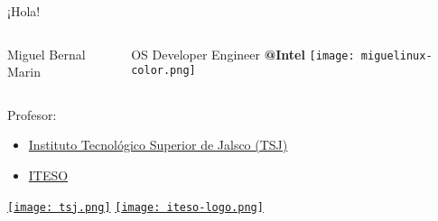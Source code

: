 
\begin{frame}[c]{¡Hola!}

  \begin{columns}
      Miguel Bernal Marin

      \vspace{\baselineskip}
      OS Developer Engineer \textbf{@Intel}
      \texttt{[image: miguelinux-color.png]}
  \end{columns}

  Profesor:
  \begin{itemize}
    \item \href{http://tsj.mx/}{Instituto Tecnológico Superior
      de Jalsco (TSJ)}
    \item \href{https://iteso.mx/}{ITESO}
  \end{itemize}

  \begin{center}
    \href{http://tecmm.edu.mx/}{\texttt{[image: tsj.png]}}
    \hspace{2cm}
    \href{https://iteso.mx/}{\texttt{[image: iteso-logo.png]}}
  \end{center}
\end{frame}
